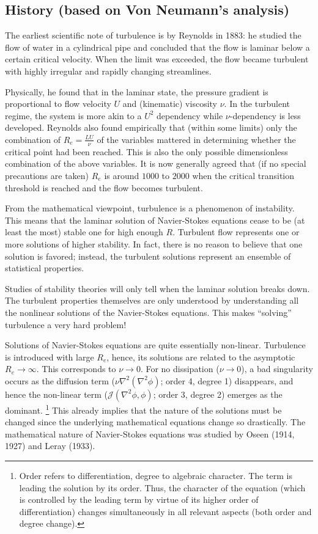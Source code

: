 \documentclass[usenatbib,twocolumn, twocolappendix]{aastex63}
\begin{document}
\subsection{History (based on Von Neumann's analysis)}

The earliest scientific note of turbulence is by Reynolds in 1883:
he studied the flow of water in a cylindrical pipe and concluded that the flow is laminar below a certain critical velocity.
When the limit was exceeded, the flow became turbulent with highly irregular and rapidly changing streamlines.

Physically, he found that in the laminar state, the pressure gradient is proportional to flow velocity $U$ and (kinematic) viscosity $\nu$.
In the turbulent regime, the system is more akin to a $U^2$ dependency while $\nu$-dependency is less developed.
Reynolds also found empirically that (within some limits) only the combination of $R_e = \frac{L U}{\nu}$ of the variables mattered in determining whether the critical point had been reached.
This is also the only possible dimensionless combination of the above variables.
It is now generally agreed that (if no special precautions are taken) $R_e$ is around $1000$ to $2000$ when the critical transition threshold is reached and the flow becomes turbulent. 


From the mathematical viewpoint, turbulence is a phenomenon of instability.
This means that the laminar solution of Navier-Stokes equations cease to be (at least the most) stable one for high enough $R$.
Turbulent flow represents one or more solutions of higher stability.
In fact, there is no reason to believe that one solution is favored; 
instead, the turbulent solutions represent an ensemble of statistical properties.

Studies of stability theories will only tell when the laminar solution breaks down.
The turbulent properties themselves are only understood by understanding all the nonlinear solutions of the Navier-Stokes equations.
This makes ``solving'' turbulence a very hard problem!

Solutions of Navier-Stokes equations are quite essentially non-linear.
Turbulence is introduced with large $R_e$, hence, its solutions are related to the asymptotic $R_e \rightarrow \infty$.
This corresponds to $\nu \rightarrow 0$.
For no dissipation ($\nu \rightarrow 0$), a bad singularity occurs as the diffusion term ($\nu \nabla^2 (\nabla^2 \phi)$; order 4, degree 1) disappears, and hence the non-linear term ($\mathcal{J}(\nabla^2 \phi, \phi)$; order 3, degree 2) emerges as the dominant.%
\footnote{
    Order refers to differentiation, degree to algebraic character.
    The term is leading the solution by its order.
    Thus, the character of the equation (which is controlled by the leading term by virtue of its higher order of differentiation) changes simultaneously in all relevant aspects (both order and degree change).
}
This already implies that the nature of the solutions must be changed since the underlying mathematical equations change so drastically. 
The mathematical nature of Navier-Stokes equations was studied by Oseen (1914, 1927) and Leray (1933).
\end{document}

